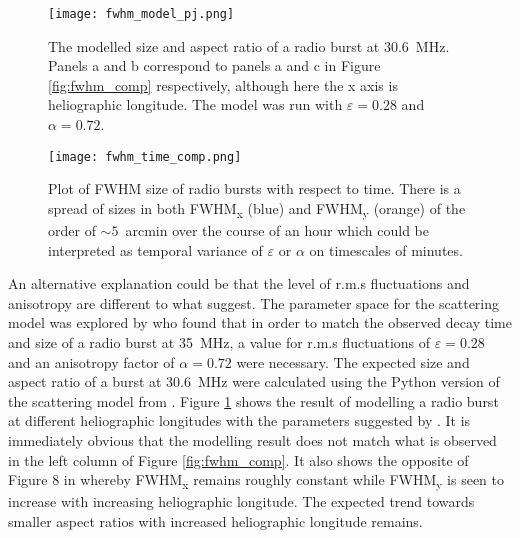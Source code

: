 \begin{figure}[ht]
\centering
\texttt{[image: fwhm\_model\_pj.png]}
\caption[The modelled size and aspect ratio of a radio burst at 30.6~MHz.]{The modelled size and aspect ratio of a radio burst at 30.6~MHz. Panels a and b correspond to panels a and c in Figure \ref{fig:fwhm_comp} respectively, although here the x axis is heliographic longitude. The model was run with $\varepsilon = 0.28$ and $\alpha = 0.72$.}
\label{fig:model_comp}
\end{figure}

\begin{figure}[ht]
\centering
\texttt{[image: fwhm\_time\_comp.png]}
\caption[Plot of FWHM size of radio bursts with respect to time.]{Plot of FWHM size of radio bursts with respect to time. There is a spread of sizes in both FWHM\textsubscript{x} (blue) and FWHM\textsubscript{y} (orange) of the order of $\sim 5$~arcmin over the course of an hour which could be interpreted as temporal variance of $\varepsilon$ or $\alpha$ on timescales of minutes.}
\label{fig:fwhm_time_comp}
\end{figure}

An alternative explanation could be that the level of r.m.s fluctuations and anisotropy are different to what \cite{Kontar2019} suggest. The parameter space for the scattering model was explored by \cite{Zhang2021} who found that in order to match the observed decay time and size of a radio burst at 35~MHz, a value for r.m.s fluctuations of $\varepsilon = 0.28$ and an anisotropy factor of $\alpha = 0.72$ were necessary. The expected size and aspect ratio of a burst at 30.6~MHz were calculated using the Python version of the \cite{Kontar2019} scattering model from \cite{Zhang2021}. Figure \ref{fig:model_comp} shows the result of modelling a radio burst at different heliographic longitudes with the parameters suggested by \cite{Zhang2021}. It is immediately obvious that the modelling result does not match what is observed in the left column of Figure \ref{fig:fwhm_comp}. It also shows the opposite of Figure 8 in \cite{Kontar2019} whereby FWHM\textsubscript{x} remains roughly constant while FWHM\textsubscript{y} is seen to increase with increasing heliographic longitude. The expected trend towards smaller aspect ratios with increased heliographic longitude remains.


